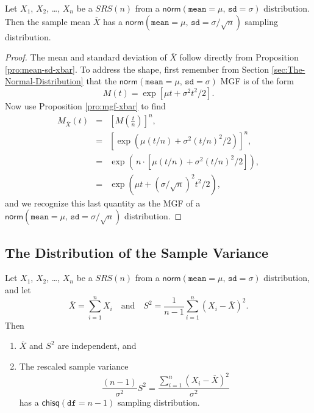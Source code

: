 \documentclass[captions=tableheading]{scrbook}
\begin{document}
\label{sub:samp-mean-dist-of}

\begin{prop}
Let \(X_{1}\), \(X_{2}\), \ldots{}, \(X_{n}\) be a \(SRS(n)\) from a \(\mathsf{norm}(\mathtt{mean}=\mu,\,\mathtt{sd}=\sigma)\) distribution. Then the sample mean \(\overline{X}\) has a \(\mathsf{norm}(\mathtt{mean}=\mu,\,\mathtt{sd}=\sigma/\sqrt{n})\) sampling distribution.
\end{prop}

\begin{proof}
The mean and standard deviation of \(\overline{X}\) follow directly from Proposition \ref{pro:mean-sd-xbar}. To address the shape, first remember from Section \ref{sec:The-Normal-Distribution} that the \(\mathsf{norm}(\mathtt{mean}=\mu,\,\mathtt{sd}=\sigma)\) MGF is of the form
\[
M(t)=\exp\left[ \mu t+\sigma^{2}t^{2}/2\right] .
\]
Now use Proposition \ref{pro:mgf-xbar} to find
\begin{eqnarray*}
M_{\overline{X}}(t) & = & \left[M\left(\frac{t}{n}\right)\right]^{n},\\
 & = & \left[\exp\left( \mu(t/n)+\sigma^{2}(t/n)^{2}/2\right) \right]^{n},\\
 & = & \exp\left( \, n\cdot\left[\mu(t/n)+\sigma^{2}(t/n)^{2}/2\right]\right) ,\\
 & = & \exp\left( \mu t+(\sigma/\sqrt{n})^{2}t^{2}/2\right),
\end{eqnarray*}
and we recognize this last quantity as the MGF of a \(\mathsf{norm}(\mathtt{mean}=\mu,\,\mathtt{sd}=\sigma/\sqrt{n})\) distribution.
\end{proof}
\subsection{The Distribution of the Sample Variance}
\label{sec-8-2-2}

\label{sub:Samp-Var-Dist}

\begin{thm}
\label{thm:Xbar-andS}
Let \(X_{1}\), \(X_{2}\), \ldots{}, \(X_{n}\) be a \(SRS(n)\) from a \(\mathsf{norm}(\mathtt{mean}=\mu,\,\mathtt{sd}=\sigma)\) distribution, and let
\begin{equation}
\overline{X}=\sum_{i=1}^{n}X_{i}\quad\mbox{and}\quad S^{2}=\frac{1}{n-1}\sum_{i=1}^{n}(X_{i}-\overline{X})^{2}.
\end{equation}
Then
\begin{enumerate}
\item \(\overline{X}\) and \(S^{2}\) are independent, and
\item The rescaled sample variance
    \begin{equation}
    \frac{(n-1)}{\sigma^{2}}S^{2}=\frac{\sum_{i=1}^{n}(X_{i}-\overline{X})^{2}}{\sigma^{2}}
    \end{equation}
    has a \(\mathsf{chisq}(\mathtt{df}=n-1)\) sampling distribution.
\end{enumerate}
\end{thm}
\end{document}
